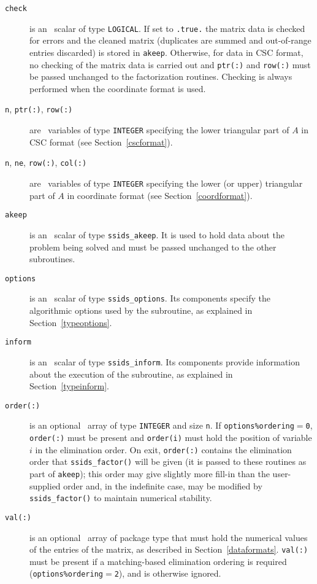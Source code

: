 \noindent
\begin{description}

\item[\texttt{check}] is an \intentin\ scalar of
type  {\tt LOGICAL}. If set to {\tt .true.} the matrix
data is checked for errors and the cleaned matrix
(duplicates are summed and out-of-range entries
discarded) is stored in {\tt akeep}.
Otherwise, for data in CSC format, no checking of the matrix data is carried out
and {\tt ptr(:)} and {\tt row(:)} must be passed unchanged to the factorization routines. 
Checking is always performed when the coordinate format is used.

\item[\texttt{n}{\rm ,} \texttt{ptr(:)}{\rm ,} \texttt{row(:)}] are \intentin\ 
   variables of type {\tt INTEGER} specifying the lower triangular part of $A$
   in CSC format (see Section~\ref{cscformat}).

\item[\texttt{n}{\rm ,} \texttt{ne}{\rm ,} \texttt{row(:)}{\rm ,} \texttt{col(:)}]
   are \intentin\ variables of type {\tt INTEGER} specifying the lower
   (or upper) triangular part of $A$ in coordinate format (see Section~\ref{coordformat}).

\item[\texttt{akeep}] is an \intentout\ scalar of type
{\tt ssids\_akeep}. It is used to hold data about the problem being
solved and must be passed unchanged to the other subroutines.

\item[\texttt{options}] is an \intentin\ scalar of type {\tt ssids\_options}.
Its components specify the algorithmic options used by the subroutine, as
explained in Section~\ref{typeoptions}.

\item[\texttt{inform}] is an \intentout\ scalar of type
{\tt ssids\_inform}. Its components provide information about the execution
of the subroutine, as explained in Section~\ref{typeinform}.

\item[\texttt{order(:)}] is an optional \intentinout\ array of type
{\tt INTEGER} and size {\tt n}. If {\tt options\%ordering}$=${\tt 0},
{\tt order(:)} must be present and {\tt order(i)} must hold the  position of
variable $i$  in the elimination order. On exit, {\tt order(:)} contains the
elimination order that {\tt ssids\_factor()} will be given (it is passed to these
routines as part of {\tt akeep}); this order may give slightly more fill-in
than the user-supplied order and, in the indefinite case, may be modified by
{\tt ssids\_factor()} to maintain numerical stability. 

\item[\texttt{val(:)}] is an optional \intentin\ array of package type that must
hold the numerical values of the entries of the matrix, as described in
Section~\ref{dataformats}.
{\tt val(:)} must be present if a matching-based elimination ordering is
required ({\tt options\%ordering$=$2}), and is otherwise ignored.

\end{description}



